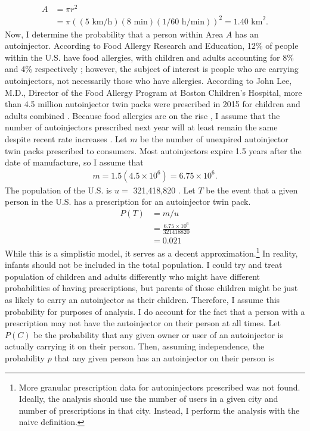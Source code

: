 \begin{align*}
    A &= \pi r^2 \\
    &= \pi\left(\left(5\text{ km/h}\right)\left(8\text{ min}\right)\left(1/60 \text{ h/min}\right)\right)^2 = 1.40 \text{ km}^2.
\end{align*}
Now, I determine the probability that a person within Area $A$ has an autoinjector. According to Food Allergy Research and Education, 12\% of people within the U.S. have food allergies, with children and adults accounting for 8\% and 4\% respectively \cite{food}; however, the subject of interest is people who are carrying autoinjectors, not necessarily those who have allergies. According to John Lee, M.D., Director of the Food Allergy Program at Boston Children's Hospital, more than 4.5 million autoinjector twin packs were prescribed in 2015 for children and adults combined \cite{johnlee}. Because food allergies are on the rise \cite{food}, I assume that the number of autoinjectors prescribed next year will at least remain the same despite recent rate increases \cite{wsjepi}. Let $m$ be the number of unexpired autoinjector twin packs prescribed to consumers. Most autoinjectors expire 1.5 years after the date of manufacture, so I assume that
\begin{align*}
    m = 1.5(4.5 \times 10^6) = 6.75 \times 10^6.
\end{align*}
The population of the U.S. is $u=$ 321,418,820 \cite{acs}. Let $T$ be the event that a given person in the U.S. has a prescription for an autoinjector twin pack.
\begin{align*}
    P(T) &= m/u \\
    &= \frac{6.75 \times 10^6}{321418820}\\
    &= 0.021
\end{align*}
While this is a simplistic model, it serves as a decent approximation.\footnote{More granular prescription data for autoninjectors prescribed was not found. Ideally, the analysis should use the number of users in a given city and number of prescriptions in that city. Instead, I perform the analysis with the naive definition.} In reality, infants should not be included in the total population. I could try and treat population of children and adults differently who might have different probabilities of having prescriptions, but parents of those children might be just as likely to carry an autoinjector as their children. Therefore, I assume this probability for purposes of analysis. I do account for the fact that a person with a prescription may not have the autoinjector on their person at all times. Let $P(C)$ be the probability that any given owner or user of an autoinjector is actually carrying it on their person. Then, assuming independence, the probability $p$ that any given person has an autoinjector on their person is 
